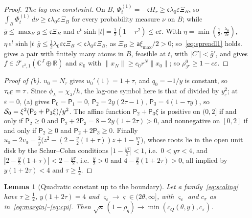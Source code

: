 \documentclass[11pt]{article}
\newtheorem{lemma}[theorem]{Lemma}
\theoremstyle{definition}
\theoremstyle{remark}
\newcommand{\R}{\mathbb R}
\newcommand{\C}{\mathbb C}
\newcommand{\cF}{\mathcal F}
\newcommand{\sfP}{\mathsf P}
\newcommand{\sh}{\sinh}
\newcommand{\norm}[1]{\lVert #1\rVert}
\newcommand{\rhoz}{\rho_{\cF}^{0}}
\newcommand{\cQ}{c_{Q}}
\newcommand{\cpi}{c_{\pi}}
\newcommand{\teff}{\tau_{\rm eff}}
\begin{document}
\begin{proof}
\emph{The lag-one constraint.}  On \(B\), \(\Phi^{(1)}_t=-\mathfrak c H_r\ge\mathfrak c\lambda_0\varepsilon \Xi_B\), so \(\int_B\Phi^{(1)}_t\,d\nu\ge\mathfrak c\lambda_0\varepsilon \Xi_B\) for every probability measure
\(\nu\) on \(B\); while \(\bar g\le\max_Bg\le\mathfrak c \Xi_B\) and \(e^t\sh|t|=\frac12(1-r^2)\le c\varepsilon\).  With \(\eta=\min(\frac12,\frac{\lambda_0}{2c})\),
\(\eta\,e^t\sh|t|\,\bar g\le\frac12\lambda_0\varepsilon\mathfrak c \Xi_B<\mathfrak c\lambda_0\varepsilon \Xi_B\), as \(\Xi_B\ge \mathsf a\xi_{\max}/2>0\); so~\eqref{eq:spreadl1} holds.   gives a
pair with finitely many atoms in \(B\), feasible at \(t\), with \(|C'|<\bar g'\), and  gives \(f\in\cF_{\varepsilon^2,1}(\C^J\oplus\R)\) and \(x_0\)
with \(\norm{x_N}\ge c_0r^N\norm{x_0}\); so \(\rhoz\ge1-c\varepsilon\).
\end{proof}

\begin{proof}[Proof of (b)]
\(u_0=N_\tau\) gives \(u_0'(1)=1+\tau\), and \(q_0=-1/y\) is constant, so \(\teff=\tau\).  Since \(\phi_\lambda=\chi_\lambda/h\), the
lag-one symbol here is that of  divided by \(y_\varepsilon^2\); at \(\varepsilon=0\), (a)
gives \(\sfP_0=\sfP_1=0\), \(\sfP_2=2y(2\tau-1)\), \(\sfP_3=4(1-\tau y)\), so \(\Szero=\xi^2(\sfP_2+\sfP_3\xi)/y^2\).  The affine function
\(\sfP_2+\sfP_3\xi\) is positive on \((0,2]\) if and only if \(\sfP_2\ge0\) and \(\sfP_2+2\sfP_3=8-2y(1+2\tau)>0\), and nonnegative on
\([0,2]\) if and only if \(\sfP_2\ge0\) and \(\sfP_2+2\sfP_3\ge0\).  Finally
\(u_0-2v_0=\frac2y\bigl(z^2-(2-\frac y2(1+\tau))z+1-\frac{y\tau}2\bigr)\), whose roots lie in the open unit disk by the
Schur--Cohn conditions \(|1-\frac{y\tau}2|<1\), i.e.\ \(0<y\tau<4\), and \(|2-\frac y2(1+\tau)|<2-\frac{y\tau}2\), i.e.\ \(\frac y2>0\) and
\(4-\frac y2(1+2\tau)>0\), all implied by \(y(1+2\tau)<4\) and \(\tau\ge\frac12\).
\end{proof}

\begin{lemma}[Quadratic constant up to the boundary]\label{lem:quadboundary}
Let a family~\eqref{eq:scaling} have \(\tau\ge\frac12\), \(y(1+2\tau)=4\) and \(\varsigma_\varepsilon\to\varsigma\in(2\theta,\infty]\), with
\(\varsigma_\varepsilon\) and \(\cpi\) as in~\eqref{eq:margin}--\eqref{eq:cpi}.  Then
\(\sqrt\kappa\,(1-\rho_q)\to\min(\cQ(\theta,y),\cpi)\).
\end{lemma}
\end{document}
